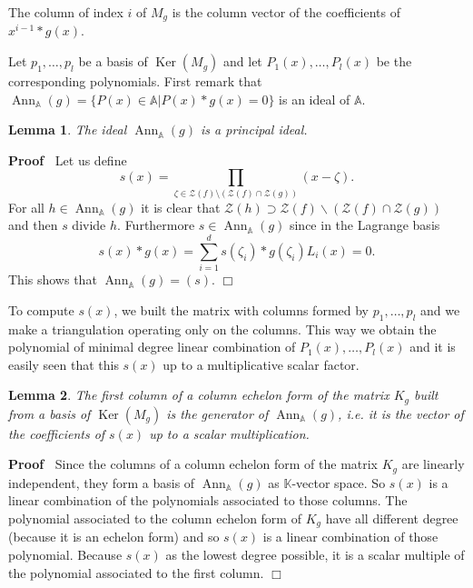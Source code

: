 \documentclass{article}
\newcommand{\tmop}[1]{\ensuremath{\operatorname{#1}}}
\newenvironment{proof}{\noindent\textbf{Proof\ }}{\hspace*{\fill}$\Box$\medskip}
\newtheorem{lemma}{Lemma}
{\theorembodyfont{\rmfamily\small}\newtheorem{problem}{Problem}}
\begin{document}
The column of index $i$ of $M_g$ is the column vector of the coefficients of
$x^{i - 1} \ast g (x)$.



Let $p_1, \ldots, p_l$ be a basis of $\tmop{Ker} (M_g)$ and let $P_1 (x),
\ldots, P_l (x)$ be the corresponding polynomials. First remark that
$\tmop{Ann}_{\mathbb{A}} (g) =\{P (x) \in \mathbb{A}| P (x) \ast g (x) =
0\}$ is an ideal of $\mathbb{A}$.

\begin{lemma}
  The ideal $\tmop{Ann}_{\mathbb{A}} (g)$ is a principal ideal. 
\end{lemma}

\begin{proof}
  Let us define
  \[ s (x) = \underset{\zeta \in \mathcal{Z}(f) \setminus (\mathcal{Z}(f) \cap
     \mathcal{Z}(g))}{\prod} (x - \zeta) . \]
  For all $h \in \tmop{Ann}_{\mathbb{A}} (g)$ it is clear that
  $\mathcal{Z}(h) \supset \mathcal{Z}(f) \backslash (\mathcal{Z}(f) \cap
  \mathcal{Z}(g))$ and then $s$ divide $h$. Furthermore $s \in
  \tmop{Ann}_{\mathbb{A}} (g)$ since in the Lagrange basis
  \[ s (x) \ast g (x) = \underset{i = 1}{\overset{d}{\sum}} s (\zeta_i) \ast
     g (\zeta_i) L_i (x) = 0. \]
  This shows that $\tmop{Ann}_{\mathbb{A}} (g) = (s)$.
\end{proof}

To compute $s (x)$, we built the matrix with columns formed by $p_1, \ldots,
p_l$ and we make a triangulation operating only on the columns. This way we
obtain the polynomial of minimal degree linear combination of $P_1 (x),
\ldots, P_l (x)$ and it is easily seen that this $s (x)$ up to a
multiplicative scalar factor.

\begin{lemma}
  The first column of a column echelon form of the matrix $K_g$ built from a
  basis of $\tmop{Ker} (M_g)$ is the generator of $\tmop{Ann}_{\mathbb{A}}
  (g)$, i.e. it is the vector of the coefficients of $s (x)$ up to a scalar
  multiplication.
\end{lemma}

\begin{proof}
  Since the columns of a column echelon form of the matrix $K_g$ are linearly
  independent, they form a basis of $\tmop{Ann}_{\mathbb{A}} (g)$ as
  $\mathbb{K}$-vector space. So $s (x)$ is a linear combination of the
  polynomials associated to those columns. The polynomial associated to the
  column echelon form of $K_g$ have all different degree (because it is an
  echelon form) and so $s (x)$ is a linear combination of those polynomial.
  Because $s (x)$ as the lowest degree possible, it is a scalar multiple of
  the polynomial associated to the first column. 
\end{proof}
\end{document}
